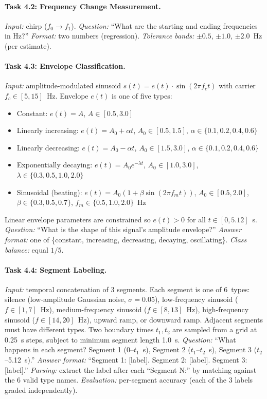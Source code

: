 \documentclass[11pt]{article}
\begin{document}
\paragraph{Task 4.2: Frequency Change Measurement.}
\emph{Input:} chirp ($f_0 \to f_1$).
\emph{Question:} ``What are the starting and ending frequencies in Hz?''
\emph{Format:} two numbers (regression).
\emph{Tolerance bands:} $\pm 0.5$, $\pm 1.0$, $\pm 2.0$~Hz (per estimate).

\paragraph{Task 4.3: Envelope Classification.}
\emph{Input:} amplitude-modulated sinusoid $s(t) = e(t)\cdot\sin(2\pi f_c t)$ with carrier $f_c \in [5,15]$~Hz. Envelope $e(t)$ is one of five types:
\begin{itemize}[nosep]
    \item Constant: $e(t) = A$, $A \in [0.5, 3.0]$
    \item Linearly increasing: $e(t) = A_0 + \alpha t$, $A_0 \in [0.5, 1.5]$, $\alpha \in \{0.1, 0.2, 0.4, 0.6\}$
    \item Linearly decreasing: $e(t) = A_0 - \alpha t$, $A_0 \in [1.5, 3.0]$, $\alpha \in \{0.1, 0.2, 0.4, 0.6\}$
    \item Exponentially decaying: $e(t) = A_0 e^{-\lambda t}$, $A_0 \in [1.0, 3.0]$, $\lambda \in \{0.3, 0.5, 1.0, 2.0\}$
    \item Sinusoidal (beating): $e(t) = A_0(1 + \beta\sin(2\pi f_m t))$, $A_0 \in [0.5, 2.0]$, $\beta \in \{0.3, 0.5, 0.7\}$, $f_m \in \{0.5, 1.0, 2.0\}$~Hz
\end{itemize}
Linear envelope parameters are constrained so $e(t) > 0$ for all $t \in [0, 5.12]$~s.
\emph{Question:} ``What is the shape of this signal's amplitude envelope?''
\emph{Answer format:} one of \{constant, increasing, decreasing, decaying, oscillating\}.
\emph{Class balance:} equal $1/5$.

\paragraph{Task 4.4: Segment Labeling.}
\emph{Input:} temporal concatenation of 3 segments. Each segment is one of 6~types: silence (low-amplitude Gaussian noise, $\sigma = 0.05$), low-frequency sinusoid ($f \in [1,7]$~Hz), medium-frequency sinusoid ($f \in [8,13]$~Hz), high-frequency sinusoid ($f \in [14,20]$~Hz), upward ramp, or downward ramp. Adjacent segments must have different types. Two boundary times $t_1, t_2$ are sampled from a grid at 0.25~s steps, subject to minimum segment length 1.0~s.
\emph{Question:} ``What happens in each segment? Segment 1 (0--$t_1$~s), Segment 2 ($t_1$--$t_2$~s), Segment 3 ($t_2$--5.12~s).''
\emph{Answer format:} ``Segment 1: [label]. Segment 2: [label]. Segment 3: [label].''
\emph{Parsing:} extract the label after each ``Segment N:'' by matching against the 6 valid type names.
\emph{Evaluation:} per-segment accuracy (each of the 3 labels graded independently).
\end{document}
